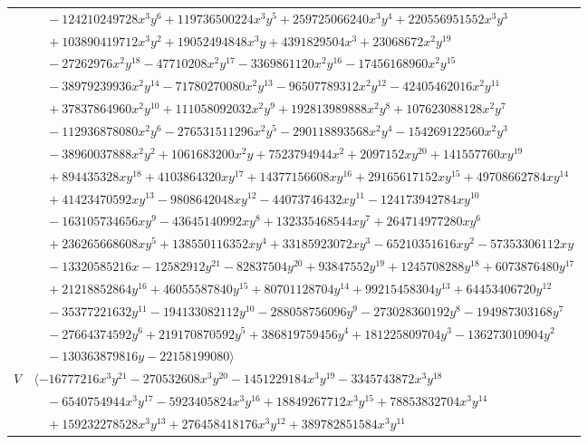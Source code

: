 \documentclass[11pt]{article}
\begin{document}
\begin{longtable}{@{}ll@{}}
 & $\quad -124210249728x^{3}y^{6}+119736500224x^{3}y^{5}+259725066240x^{3}y^{4}+220556951552x^{3}y^{3}$\\
 & $\quad +103890419712x^{3}y^{2}+19052494848x^{3}y+4391829504x^{3}+23068672x^{2}y^{19}$\\
 & $\quad -27262976x^{2}y^{18}-47710208x^{2}y^{17}-3369861120x^{2}y^{16}-17456168960x^{2}y^{15}$\\
 & $\quad -38979239936x^{2}y^{14}-71780270080x^{2}y^{13}-96507789312x^{2}y^{12}-42405462016x^{2}y^{11}$\\
 & $\quad +37837864960x^{2}y^{10}+111058092032x^{2}y^{9}+192813989888x^{2}y^{8}+107623088128x^{2}y^{7}$\\
 & $\quad -112936878080x^{2}y^{6}-276531511296x^{2}y^{5}-290118893568x^{2}y^{4}-154269122560x^{2}y^{3}$\\
 & $\quad -38960037888x^{2}y^{2}+1061683200x^{2}y+7523794944x^{2}+2097152xy^{20}+141557760xy^{19}$\\
 & $\quad +894435328xy^{18}+4103864320xy^{17}+14377156608xy^{16}+29165617152xy^{15}+49708662784xy^{14}$\\
 & $\quad +41423470592xy^{13}-9808642048xy^{12}-44073746432xy^{11}-124173942784xy^{10}$\\
 & $\quad -163105734656xy^{9}-43645140992xy^{8}+132335468544xy^{7}+264714977280xy^{6}$\\
 & $\quad +236265668608xy^{5}+138550116352xy^{4}+33185923072xy^{3}-65210351616xy^{2}-57353306112xy$\\
 & $\quad -13320585216x-12582912y^{21}-82837504y^{20}+93847552y^{19}+1245708288y^{18}+6073876480y^{17}$\\
 & $\quad +21218852864y^{16}+46055587840y^{15}+80701128704y^{14}+99215458304y^{13}+64453406720y^{12}$\\
 & $\quad -35377221632y^{11}-194133082112y^{10}-288058756096y^{9}-273028360192y^{8}-194987303168y^{7}$\\
 & $\quad -27664374592y^{6}+219170870592y^{5}+386819759456y^{4}+181225809704y^{3}-136273010904y^{2}$\\
 & $\quad -130363879816y-22158199080\rangle$\\
$V$ & $\langle -16777216x^{3}y^{21}-270532608x^{3}y^{20}-1451229184x^{3}y^{19}-3345743872x^{3}y^{18}$\\
 & $\quad -6540754944x^{3}y^{17}-5923405824x^{3}y^{16}+18849267712x^{3}y^{15}+78853832704x^{3}y^{14}$\\
 & $\quad +159232278528x^{3}y^{13}+276458418176x^{3}y^{12}+389782851584x^{3}y^{11}$\\

\end{longtable}
\end{document}
